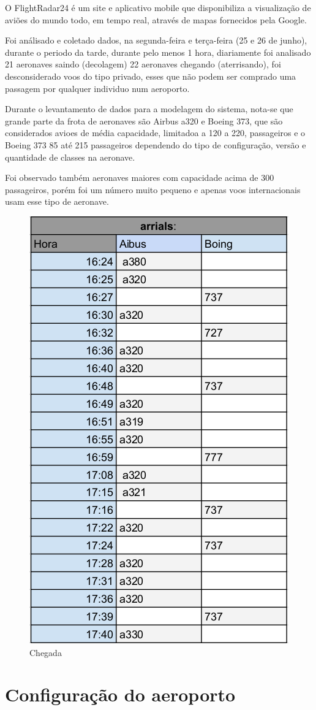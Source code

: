 \documentclass[12pt]{article}
\begin{document}
O  FlightRadar24 é um site e aplicativo mobile que disponibiliza a
visualização de aviões do mundo todo, em tempo real, através de mapas 
fornecidos pela Google.

Foi análisado e coletado dados, na segunda-feira e terça-feira (25 e 26 de junho), durante 
o periodo da tarde, durante pelo menos 1 hora, diariamente foi analisado 21
aeronaves saindo (decolagem) 22 aeronaves chegando (aterrisando), foi desconsiderado voos do 
tipo privado, esses que não podem ser comprado uma passagem por qualquer
individuo num aeroporto.

Durante o levantamento de dados para a modelagem do sistema, nota-se que grande parte
da frota de aeronaves são Airbus a320 e Boeing 373, que são considerados avioes de média
capacidade, limitadoa a 120 a 220, passageiros e o Boeing 373 85 até 215 passageiros 
dependendo do tipo de configuração, versão e quantidade de classes na aeronave.

Foi observado também aeronaves maiores com capacidade acima de 300 passageiros, porém 
foi um número muito pequeno e apenas voos internacionais usam esse tipo de aeronave.

\begin{figure}[h!]
  \centering
  \includegraphics[width=.3\textwidth]{aterrisagem.png}
  \caption{Chegada}
  \label{fig:chegando}
\end{figure}



\section{Configuração do aeroporto}
\end{document}
